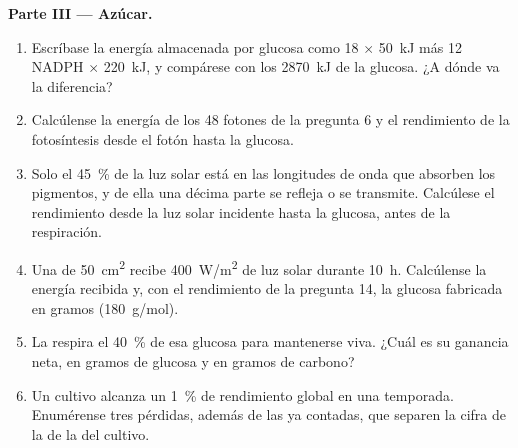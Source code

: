 \begin{problem}
\medskip
\noindent\textbf{Parte III --- Azúcar.}
\begin{enumerate}[resume]
  \item Escríbase la energía almacenada por glucosa como 18  $\times$
        \qty{50}{kJ} más 12 NADPH $\times$ \qty{220}{kJ}, y compárese con
        los \qty{2870}{kJ} de la glucosa. ¿A dónde va la diferencia?
  \item Calcúlense la energía de los 48 fotones de la pregunta 6 y el
        rendimiento de la fotosíntesis desde el fotón hasta la glucosa.
  \item Solo el \qty{45}{\%} de la luz solar está en las longitudes de onda
        que absorben los pigmentos, y de ella una décima parte se refleja o
        se transmite. Calcúlese el rendimiento desde la luz solar incidente
        hasta la glucosa, antes de la respiración.
  \item Una  de \qty{50}{cm^2} recibe \qty{400}{W/m^2} de luz solar
        durante \qty{10}{h}. Calcúlense la energía recibida y, con el
        rendimiento de la pregunta 14, la glucosa fabricada en gramos
        (\qty{180}{g/mol}).
  \item La  respira el \qty{40}{\%} de esa glucosa para mantenerse
        viva. ¿Cuál es su ganancia neta, en gramos de glucosa y en gramos
        de carbono?
  \item Un cultivo alcanza un \qty{1}{\%} de rendimiento global en una
        temporada. Enumérense tres pérdidas, además de las ya contadas, que
        separen la cifra de la  de la del cultivo.
\end{enumerate}


\end{problem}
